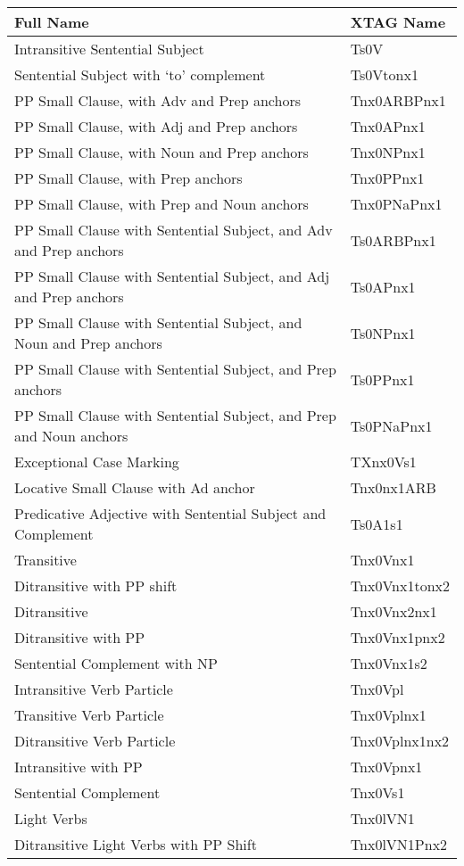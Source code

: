 \small
\begin{tabular}{ll}
Full Name&XTAG Name\\
\hline
Intransitive Sentential Subject &  Ts0V\\
Sentential Subject with `to' complement &  Ts0Vtonx1\\
PP Small Clause, with Adv and Prep anchors & Tnx0ARBPnx1\\
PP Small Clause, with Adj and Prep anchors & Tnx0APnx1\\
PP Small Clause, with Noun and Prep anchors & Tnx0NPnx1\\
PP Small Clause, with Prep anchors & Tnx0PPnx1\\
PP Small Clause, with Prep and Noun anchors & Tnx0PNaPnx1\\
PP Small Clause with Sentential Subject, and Adv and Prep anchors & Ts0ARBPnx1\\
PP Small Clause with Sentential Subject, and Adj and Prep anchors & Ts0APnx1\\
PP Small Clause with Sentential Subject, and Noun and Prep anchors & Ts0NPnx1\\
PP Small Clause with Sentential Subject, and Prep anchors & Ts0PPnx1\\
PP Small Clause with Sentential Subject, and Prep and Noun anchors & Ts0PNaPnx1\\
Exceptional Case Marking & TXnx0Vs1\\
Locative Small Clause with Ad anchor & Tnx0nx1ARB\\
Predicative Adjective with Sentential Subject and Complement & Ts0A1s1\\
Transitive & Tnx0Vnx1\\
Ditransitive with PP shift & Tnx0Vnx1tonx2\\
Ditransitive & Tnx0Vnx2nx1\\
Ditransitive with PP & Tnx0Vnx1pnx2\\
Sentential Complement with NP & Tnx0Vnx1s2\\
Intransitive Verb Particle & Tnx0Vpl\\
Transitive Verb Particle & Tnx0Vplnx1\\
Ditransitive Verb Particle & Tnx0Vplnx1nx2\\
Intransitive with PP & Tnx0Vpnx1\\
Sentential Complement & Tnx0Vs1\\
Light Verbs & Tnx0lVN1\\
Ditransitive Light Verbs with PP Shift & Tnx0lVN1Pnx2\\

\end{tabular}
